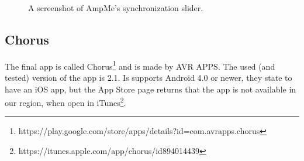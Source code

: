 \begin{figure}[h!]
\begin{minipage}[b]{0.45\textwidth}
        \caption{A screenshot of AmpMe's synchronization slider.}\label{fig:ampme_slider}
    \end{minipage}
\end{figure}

\subsection{Chorus}\label{subsec:chorus}
The final app is called Chorus\footnote{https://play.google.com/store/apps/details?id=com.avrapps.chorus} and is made by AVR APPS.
The used (and tested) version of the app is 2.1.
Is supports Android 4.0 or newer, they state to have an iOS app, but the App Store page returns that the app is not available in our region,
when open in iTunes\footnote{https://itunes.apple.com/app/chorus/id894014439}.

